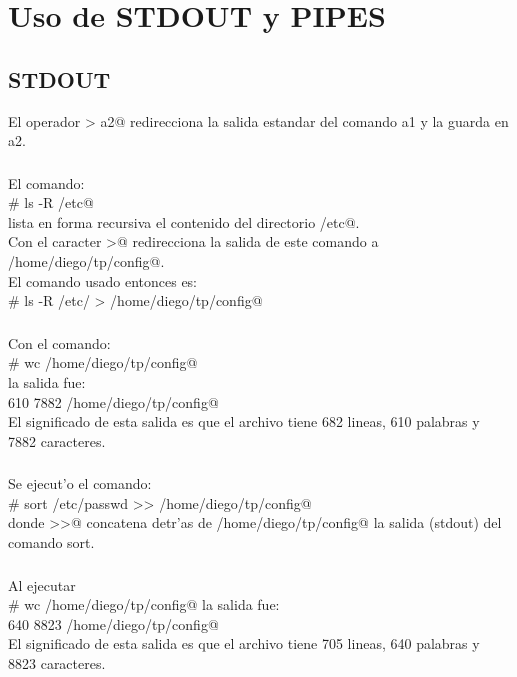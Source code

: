 \section{Uso de STDOUT y PIPES}
	\subsection{STDOUT}
		\noindent El operador  > a2@ redirecciona la salida estandar del comando a1 y la guarda en a2.
			\subsubsection[]{}
			\noindent El comando:\\
			 \verb@# ls -R /etc@ \\
			lista en forma recursiva el contenido del directorio \verb@/etc@.\\
			Con el caracter \verb@>@ redirecciona la salida de este comando a \verb@ /home/diego/tp/config@.\\
			El comando usado entonces es:\\
			 \verb@# ls -R /etc/ > /home/diego/tp/config@

			\subsubsection[]{}
			\noindent Con el comando:\\
			 \verb@# wc /home/diego/tp/config@\\
			la salida fue:\\
			 610 7882 /home/diego/tp/config@\\
			El significado de esta salida es que el archivo tiene 682 lineas, 610 palabras y 7882 caracteres.

		  \subsubsection[]{}
		  \noindent Se ejecut'o el comando:\\
		    \verb@# sort /etc/passwd >> /home/diego/tp/config@\\
		  donde \verb@>>@  concatena detr'as de \verb@/home/diego/tp/config@ la salida (stdout) del comando sort.

		  \subsubsection[]{}
			\noindent Al ejecutar\\
			  \verb@# wc /home/diego/tp/config@ la salida fue:\\
			   640 8823 /home/diego/tp/config@\\
			El significado de esta salida es que el archivo tiene 705 lineas, 640 palabras y 8823 caracteres.

